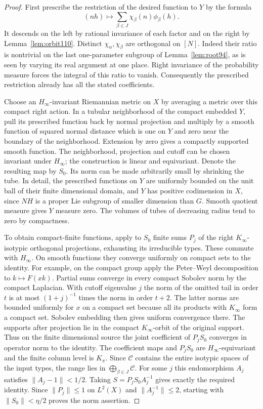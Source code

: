 \documentclass[a4paper,11pt]{article}
\theoremstyle{definition}
\theoremstyle{remark}
\numberwithin{equation}{section}
\begin{document}
\begin{proof}
First prescribe the restriction of the desired function to \(Y\)
by the formula
\[
             (nh)\longmapsto
                 \sum_{\beta\in J}\chi_\beta(n)\phi_\beta(h).
\]
It descends on the left by rational invariance of each factor
and on the right by Lemma~\ref{lem:orbit110}. Distinct
\(\chi_\alpha,\chi_\beta\) are orthogonal on \([N]\). Indeed
their ratio is nontrivial on the last one-parameter subgroup
of Lemma~\ref{lem:root94}, as is seen by varying its real
argument at one place. Right invariance of the probability
measure forces the integral of this ratio to vanish.
Consequently the prescribed restriction already has all the
stated coefficients.

Choose an \(H_\infty\)-invariant Riemannian metric on \(X\) by
averaging a metric over this compact right action. In a tubular
neighborhood of the compact embedded \(Y\), pull its prescribed
function back by normal projection and multiply by a smooth
function of squared normal distance which is one on \(Y\) and
zero near the boundary of the neighborhood. Extension by zero
gives a compactly supported smooth function. The neighborhood,
projection and cutoff can be chosen invariant under \(H_\infty\);
the construction is linear and equivariant. Denote the resulting
map by \(S_0\). Its norm can be made arbitrarily small by
shrinking the tube. In detail, the prescribed functions on \(Y\)
are uniformly bounded on the unit ball of their finite dimensional
domain, and \(Y\) has positive codimension in \(X\), since
\(NH\) is a proper Lie subgroup of smaller dimension than \(G\).
Smooth quotient measure gives \(Y\) measure zero. The volumes
of tubes of decreasing radius tend to zero by compactness.

To obtain compact-finite functions, apply to \(S_0\) finite
sums \(P_j\) of the right \(K_\infty\)-isotypic orthogonal
projections, exhausting its irreducible types. These commute
with \(H_\infty\). On smooth functions they converge uniformly
on compact sets to the identity. For example, on the compact
group apply the Peter--Weyl decomposition to
\(k\mapsto F(xk)\). Partial sums converge in every compact
Sobolev norm by the compact Laplacian. With cutoff eigenvalue
\(j\) the norm of the omitted tail in order \(t\) is at most
\((1+j)^{-1}\) times the norm in order \(t+2\). The latter norms
are bounded uniformly for \(x\) on a compact set because all
its products with \(K_\infty\) form a compact set. Sobolev
embedding then gives uniform convergence there.
The supports after projection lie in the compact \(K_\infty\)-orbit
of the original support. Thus on the finite dimensional source
the joint coefficient of \(P_jS_0\) converges in operator norm
to the identity. The coefficient maps and \(P_jS_0\) are
\(H_\infty\)-equivariant and the finite column level is \(K_\pi\).
Since \(\mathcal C\) contains the entire isotypic spaces of the
input types, the range lies in \(\bigoplus_{\beta\in J}\mathcal C\).
For some \(j\) this endomorphism
\(A_j\) satisfies \(\|A_j-1\|<1/2\). Taking
\(S=P_jS_0 A_j^{-1}\) gives exactly the required identity.
Since \(\|P_j\|\le1\) on \(L^2(X)\) and \(\|A_j^{-1}\|\le2\),
starting with \(\|S_0\|<\eta/2\) proves the norm assertion.
\end{proof}
\end{document}

